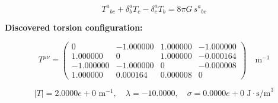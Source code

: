
\begin{equation}
  T^a{}_{bc} + \delta^a_b T_c - \delta^a_c T_b = 8\pi G \, s^a{}_{bc}
\end{equation}

\textbf{Discovered torsion configuration:}

\begin{equation}
  T^{\mu\nu} = \begin{pmatrix}
    0 & -1.000000 & 1.000000 & -1.000000 \\
    1.000000 & 0 & 1.000000 & -0.000164 \\
    -1.000000 & -1.000000 & 0 & -0.000008 \\
    1.000000 & 0.000164 & 0.000008 & 0
  \end{pmatrix} \quad \text{m}^{-1}
\end{equation}

\begin{equation}
  |T| = 2.0000e+0 \text{ m}^{-1}, \quad
  \lambda = -10.0000, \quad
  \sigma = 0.0000e+0 \text{ J}\cdot\text{s/m}^3
\end{equation}